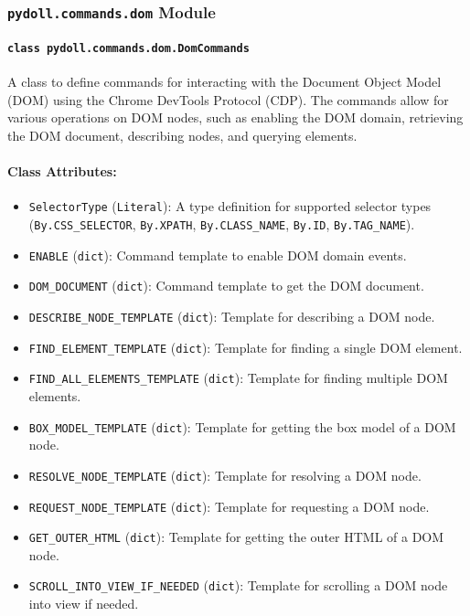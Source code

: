 \documentclass{article}
\begin{document}
\subsubsection*{\texttt{pydoll.commands.dom} Module}

\paragraph*{\texttt{class pydoll.commands.dom.DomCommands}}
\noindent A class to define commands for interacting with the Document Object Model (DOM) using the Chrome DevTools Protocol (CDP). The commands allow for various operations on DOM nodes, such as enabling the DOM domain, retrieving the DOM document, describing nodes, and querying elements.

\paragraph{Class Attributes:}
\begin{itemize}
    \item \texttt{SelectorType} (\texttt{Literal}): A type definition for supported selector types (\texttt{By.CSS\_SELECTOR}, \texttt{By.XPATH}, \texttt{By.CLASS\_NAME}, \texttt{By.ID}, \texttt{By.TAG\_NAME}).
    \item \texttt{ENABLE} (\texttt{dict}): Command template to enable DOM domain events.
    \item \texttt{DOM\_DOCUMENT} (\texttt{dict}): Command template to get the DOM document.
    \item \texttt{DESCRIBE\_NODE\_TEMPLATE} (\texttt{dict}): Template for describing a DOM node.
    \item \texttt{FIND\_ELEMENT\_TEMPLATE} (\texttt{dict}): Template for finding a single DOM element.
    \item \texttt{FIND\_ALL\_ELEMENTS\_TEMPLATE} (\texttt{dict}): Template for finding multiple DOM elements.
    \item \texttt{BOX\_MODEL\_TEMPLATE} (\texttt{dict}): Template for getting the box model of a DOM node.
    \item \texttt{RESOLVE\_NODE\_TEMPLATE} (\texttt{dict}): Template for resolving a DOM node.
    \item \texttt{REQUEST\_NODE\_TEMPLATE} (\texttt{dict}): Template for requesting a DOM node.
    \item \texttt{GET\_OUTER\_HTML} (\texttt{dict}): Template for getting the outer HTML of a DOM node.
    \item \texttt{SCROLL\_INTO\_VIEW\_IF\_NEEDED} (\texttt{dict}): Template for scrolling a DOM node into view if needed.
\end{itemize}
\end{document}
